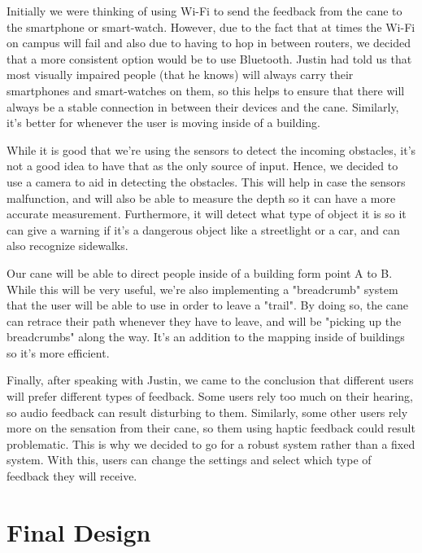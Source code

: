 \documentclass[letterpaper,12pt]{article}
\begin{document}
Initially we were thinking of using Wi-Fi to send the feedback from the cane to the smartphone or smart-watch. However, due to the fact that at times the Wi-Fi on campus will fail and also due to having to hop in between routers, we decided that a more consistent option would be to use Bluetooth. Justin had told us that most visually impaired people (that he knows) will always carry their smartphones and smart-watches on them, so this helps to ensure that there will always be a stable connection in between their devices and the cane. Similarly, it's better for whenever the user is moving inside of a building.\par

While it is good that we're using the sensors to detect the incoming obstacles, it's not a good idea to have that as the only source of input. Hence, we decided to use a camera to aid in detecting the obstacles. This will help in case the sensors malfunction, and will also be able to measure the depth so it can have a more accurate measurement. Furthermore, it will detect what type of object it is so it can give a warning if it's a dangerous object like a streetlight or a car, and can also recognize sidewalks.\par

Our cane will be able to direct people inside of a building form point A to B. While this will be very useful, we're also implementing a "breadcrumb" system that the user will be able to use in order to leave a "trail". By doing so, the cane can retrace their path whenever they have to leave, and will be "picking up the breadcrumbs" along the way. It's an addition to the mapping inside of buildings so it's more efficient.\par

Finally, after speaking with Justin, we came to the conclusion that different users will prefer different types of feedback. Some users rely too much on their hearing, so audio feedback can result disturbing to them. Similarly, some other users rely more on the sensation from their cane, so them using haptic feedback could result problematic. This is why we decided to go for a robust system rather than a fixed system. With this, users can change the settings and select which type of feedback they will receive.

\section{Final Design}

\end{document}
